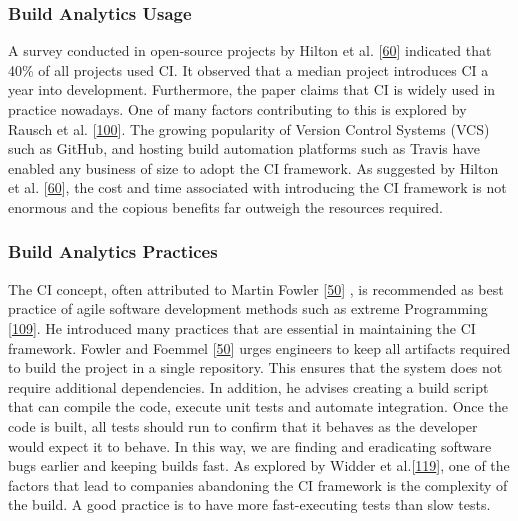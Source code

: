 \documentclass[]{book}
\begin{document}
\subsubsection{Build Analytics Usage}\label{build-analytics-usage}

A survey conducted in open-source projects by Hilton et al.
{[}\protect\hyperlink{ref-hilton2016usage}{60}{]} indicated that 40\% of
all projects used CI. It observed that a median project introduces CI a
year into development. Furthermore, the paper claims that CI is widely
used in practice nowadays. One of many factors contributing to this is
explored by Rausch et al.
{[}\protect\hyperlink{ref-rausch2017empirical}{100}{]}. The growing
popularity of Version Control Systems (VCS) such as GitHub, and hosting
build automation platforms such as Travis have enabled any business of
size to adopt the CI framework. As suggested by Hilton et al.
{[}\protect\hyperlink{ref-hilton2016usage}{60}{]}, the cost and time
associated with introducing the CI framework is not enormous and the
copious benefits far outweigh the resources required.

\subsubsection{Build Analytics
Practices}\label{build-analytics-practices}

The CI concept, often attributed to Martin Fowler
{[}\protect\hyperlink{ref-fowler2006continuous}{50}{]} , is recommended
as best practice of agile software development methods such as extreme
Programming {[}\protect\hyperlink{ref-stolberg2009enabling}{109}{]}. He
introduced many practices that are essential in maintaining the CI
framework. Fowler and Foemmel
{[}\protect\hyperlink{ref-fowler2006continuous}{50}{]} urges engineers
to keep all artifacts required to build the project in a single
repository. This ensures that the system does not require additional
dependencies. In addition, he advises creating a build script that can
compile the code, execute unit tests and automate integration. Once the
code is built, all tests should run to confirm that it behaves as the
developer would expect it to behave. In this way, we are finding and
eradicating software bugs earlier and keeping builds fast. As explored
by Widder et al.{[}\protect\hyperlink{ref-widder2018m}{119}{]}, one of
the factors that lead to companies abandoning the CI framework is the
complexity of the build. A good practice is to have more fast-executing
tests than slow tests.
\end{document}
